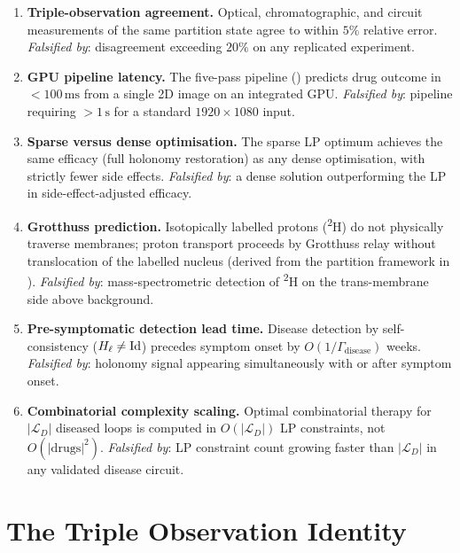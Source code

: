 \begin{enumerate}[label=\textbf{P\arabic*.}, leftmargin=3em]
\item \textbf{Triple-observation agreement.}
  Optical, chromatographic, and circuit measurements of the same
  partition state agree to within $5\%$ relative error.
  \emph{Falsified by}: disagreement exceeding $20\%$ on any replicated
  experiment.

\item \textbf{GPU pipeline latency.}
  The five-pass pipeline () predicts drug outcome
  in $< 100\,\mathrm{ms}$ from a single 2D image on an integrated GPU.
  \emph{Falsified by}: pipeline requiring $> 1\,\mathrm{s}$ for a
  standard $1920\times 1080$ input.

\item \textbf{Sparse versus dense optimisation.}
  The sparse LP optimum achieves the same efficacy (full holonomy
  restoration) as any dense optimisation, with strictly fewer side effects.
  \emph{Falsified by}: a dense solution outperforming the LP in
  side-effect-adjusted efficacy.

\item \textbf{Grotthuss prediction.}
  Isotopically labelled protons (\textsuperscript{2}H) do not physically
  traverse membranes; proton transport proceeds by Grotthuss relay without
  translocation of the labelled nucleus (derived from the partition
  framework in ).
  \emph{Falsified by}: mass-spectrometric detection of \textsuperscript{2}H
  on the trans-membrane side above background.

\item \textbf{Pre-symptomatic detection lead time.}
  Disease detection by self-consistency ($H_\ell \neq \mathrm{Id}$) precedes
  symptom onset by $O(1/\Gamma_{\mathrm{disease}})$ weeks.
  \emph{Falsified by}: holonomy signal appearing simultaneously with or
  after symptom onset.

\item \textbf{Combinatorial complexity scaling.}
  Optimal combinatorial therapy for $|\mathcal{L}_D|$ diseased loops is
  computed in $O(|\mathcal{L}_D|)$ LP constraints, not $O(|\text{drugs}|^2)$.
  \emph{Falsified by}: LP constraint count growing faster than
  $|\mathcal{L}_D|$ in any validated disease circuit.

\end{enumerate}

\section{The Triple Observation Identity}
\label{sec:ch09-triple-obs-identity}

